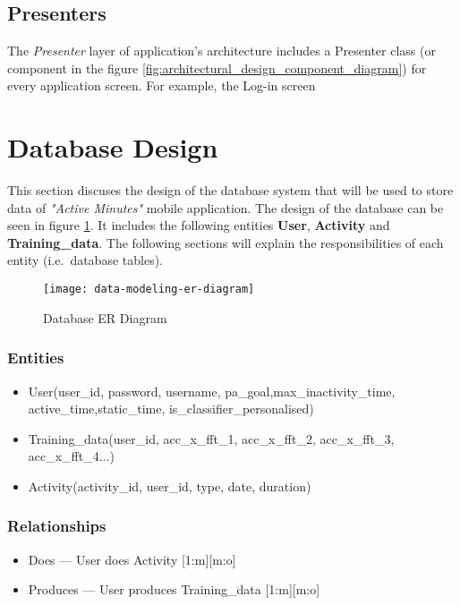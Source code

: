             
        \subsection{Presenters}
        The \textit{Presenter} layer of application's architecture includes a Presenter class (or component in the figure  \ref{fig:architectural_design_component_diagram}) for every application screen. For example, the Log-in screen 
    
    \section{Database Design}
    This section discuses the design of the database system that will be used to store data of \textit{"Active Minutes"} mobile application. The design of the database can be seen in figure \ref{fig:data_modeling_er_diagram}. It includes the following entities \textbf{User}, \textbf{Activity} and \textbf{Training\_data}. The following sections will explain the responsibilities of each entity (i.e.\ database tables).
        
        \begin{figure}[ht]
            \centering
            \texttt{[image: data-modeling-er-diagram]}
            \caption{Database ER Diagram}
            \label{fig:data_modeling_er_diagram}
        \end{figure}
        
        \subsubsection{Entities}
        
        \begin{itemize}
            \item User(user\_id, password, username, pa\_goal,max\_inactivity\_time, active\_time,\newline static\_time, is\_classifier\_personalised)
            \item Training\_data(user\_id, acc\_x\_fft\_1, acc\_x\_fft\_2, acc\_x\_fft\_3, acc\_x\_fft\_4...)
            \item Activity(activity\_id, user\_id, type, date, duration)
        \end{itemize}
        
        \subsubsection{Relationships}
        \begin{itemize}
        \item Does --- User does Activity [1:m][m:o]
        \item Produces --- User produces Training\_data [1:m][m:o]
        \end{itemize}
        
